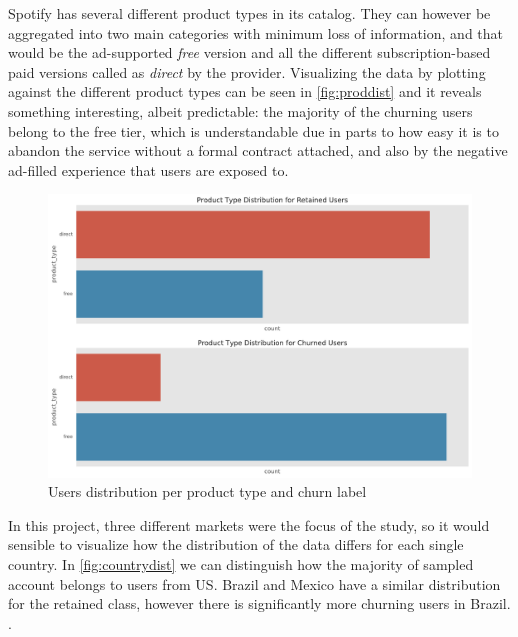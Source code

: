 \documentclass{kththesis}
\begin{document}
Spotify has several different product types in its catalog. They can however be aggregated into two main categories with minimum loss of information, and that would be the ad-supported \emph{free} version and all the different subscription-based paid versions called as \emph{direct} by the provider. Visualizing the data by plotting against the different product types can be seen in \autoref{fig:proddist} and it reveals something interesting, albeit predictable: the majority of the churning users belong to the free tier, which is understandable due in parts to how easy it is to abandon the service without a formal contract attached, and also by the negative ad-filled experience that users are exposed to. 

	\begin{figure}[H]
    \centering
    \includegraphics[width=0.99\linewidth,height=0.9\textheight,keepaspectratio]{figures/dist_product_type.pdf}
    \caption{Users distribution per product type and churn label}
    \label{fig:proddist}
	\end{figure}

In this project, three different markets were the focus of the study, so it would sensible to visualize how the distribution of the data differs for each single country. In \autoref{fig:countrydist} we can distinguish how the majority of sampled account belongs to users from US. Brazil and Mexico have a similar distribution for the retained class, however there is significantly more churning users in Brazil. .
\end{document}
